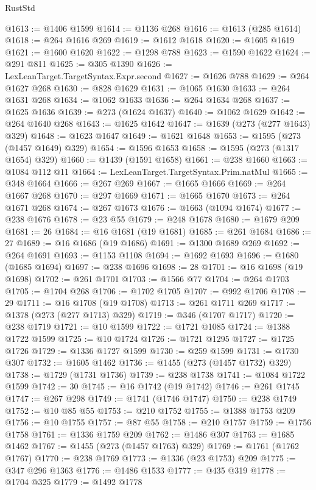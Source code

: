 \begin{lexlean}{RustStd}
\begin{coremodule}
{\begin{coremodule}
{{{{{{{{{{{{{{{{{{{{{{{{{{{{{{{{{{{{{{{{{{{{{{{{{{{{{{{{{{{{{{{{{{{{{{{{{{{{{{{{{{{{{@1613 := @1406 @1599
@1614 := @1136 @268
@1616 := @1613 (@285 @1614)
@1618 := @264 @1616 @269
@1619 := @1612 @1618
@1620 := @1605 @1619
@1621 := @1600 @1620
@1622 := @1298 @788
@1623 := @1590 @1622
@1624 := @291 @811
@1625 := @305 @1390
@1626 := LexLeanTarget.TargetSyntax.Expr.second
@1627 := @1626 @788
@1629 := @264 @1627 @268
@1630 := @828 @1629
@1631 := @1065 @1630
@1633 := @264 @1631 @268
@1634 := @1062 @1633
@1636 := @264 @1634 @268
@1637 := @1625 @1636
@1639 := @273 (@1624 @1637)
@1640 := @1062 @1629
@1642 := @264 @1640 @268
@1643 := @1625 @1642
@1647 := @1639 (@273 (@277 @1643) @329)
@1648 := @1623 @1647
@1649 := @1621 @1648
@1653 := @1595 (@273 (@1457 @1649) @329)
@1654 := @1596 @1653
@1658 := @1595 (@273 (@1317 @1654) @329)
@1660 := @1439 (@1591 @1658)
@1661 := @238 @1660
@1663 := @1084 @112 @11
@1664 := LexLeanTarget.TargetSyntax.Prim.natMul
@1665 := @348 @1664
@1666 := @267 @269
@1667 := @1665 @1666
@1669 := @264 @1667 @268
@1670 := @297 @1669
@1671 := @1665 @1670
@1673 := @264 @1671 @268
@1674 := @267 @1673
@1676 := @1663 (@1094 @1674)
@1677 := @238 @1676
@1678 := @23 @55
@1679 := @248 @1678
@1680 := @1679 @209
@1681 := 26
@1684 := @16 @1681 (@19 @1681)
@1685 := @261 @1684
@1686 := 27
@1689 := @16 @1686 (@19 @1686)
@1691 := @1300 @1689 @269
@1692 := @264 @1691
@1693 := @1153 @1108
@1694 := @1692 @1693
@1696 := @1680 (@1685 @1694)
@1697 := @238 @1696
@1698 := 28
@1701 := @16 @1698 (@19 @1698)
@1702 := @261 @1701
@1703 := @1566 @77
@1704 := @264 @1703
@1705 := @1704 @268
@1706 := @1702 @1705
@1707 := @992 @1706
@1708 := 29
@1711 := @16 @1708 (@19 @1708)
@1713 := @261 @1711 @269
@1717 := @1378 (@273 (@277 @1713) @329)
@1719 := @346 (@1707 @1717)
@1720 := @238 @1719
@1721 := @10 @1599
@1722 := @1721 @1085
@1724 := @1388 @1722 @1599
@1725 := @10 @1724
@1726 := @1721 @1295
@1727 := @1725 @1726
@1729 := @1336 @1727 @1599
@1730 := @259 @1599
@1731 := @1730 @307
@1732 := @1605 @1462
@1736 := @1455 (@273 (@1457 @1732) @329)
@1738 := @1729 (@1731 @1736)
@1739 := @238 @1738
@1741 := @1084 @1722 @1599
@1742 := 30
@1745 := @16 @1742 (@19 @1742)
@1746 := @261 @1745
@1747 := @267 @298
@1749 := @1741 (@1746 @1747)
@1750 := @238 @1749
@1752 := @10 @85 @55
@1753 := @210 @1752
@1755 := @1388 @1753 @209
@1756 := @10 @1755
@1757 := @87 @55
@1758 := @210 @1757
@1759 := @1756 @1758
@1761 := @1336 @1759 @209
@1762 := @1486 @307
@1763 := @1685 @1462
@1767 := @1455 (@273 (@1457 @1763) @329)
@1769 := @1761 (@1762 @1767)
@1770 := @238 @1769
@1773 := @1336 (@23 @1753) @209
@1775 := @347 @296 @1363
@1776 := @1486 @1533
@1777 := @435 @319
@1778 := @1704 @325
@1779 := @1492 @1778
}}}}}}}}}}}}}}}}}}}}}}}}}}}}}}}}}}}}}}}}}}}}}}}}}}}}}}}}}}}}}}}}}}}}}}}}}}}}}}}}}}}}}
\end{coremodule}}
\end{coremodule}
\end{lexlean}
